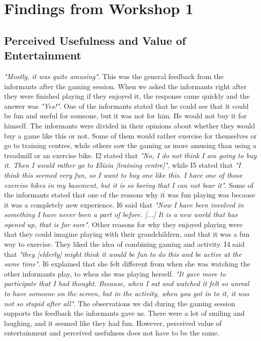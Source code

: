 \chapter{Findings from Workshop 1}

\section{Perceived Usefulness and Value of Entertainment}
\emph{"Mostly, it was quite amusing"}. This was the general feedback from the informants after the gaming session. When we asked the informants right after they were finished playing if they enjoyed it, the response came quickly and the answer was \emph{"Yes!"}. One of the informants stated that he could see that it could be fun and useful for someone, but it was not for him. He would not buy it for himself. The informants were divided in their opinions about whether they would buy a game like this or not. Some of them would rather exercise for themselves or go to training centres, while others saw the gaming as more amusing than using a treadmill or an exercise bike. I2 stated that \emph{"No, I do not think I am going to buy it. Then I would rather go to Elixia [training centre]"}, while I5 stated that \emph{"I think this seemed very fun, so I want to buy one like this. I have one of those exercise bikes in my basement, but it is so boring that I can not bear it"}.  Some of the informants stated that one of the reasons why it was fun playing was because it was a completely new experience. I6 said that \emph{"Now I have been involved in something I have never been a part of before. [...] It is a new world that has opened up, that is for sure"}. Other reasons for why they enjoyed playing were that they could imagine playing with their grandchildren, and that it was a fun way to exercise. They liked the idea of combining gaming and activity. I4 said that \emph{"they [elderly] might think it would be fun to do this and be active at the same time"}. I6 explained that she felt different from when she was watching the other informants play, to when she was playing herself. \emph{"It gave more to participate that I had thought. Because, when I sat and watched it felt so unreal to have someone on the screen, but in the activity, when you got in to it, it was not so stupid after all"}. The observations we did during the gaming session supports the feedback the informants gave us. There were a lot of smiling and laughing, and it seemed like they had fun. However, perceived value of entertainment and perceived usefulness does not have to be the same. 

